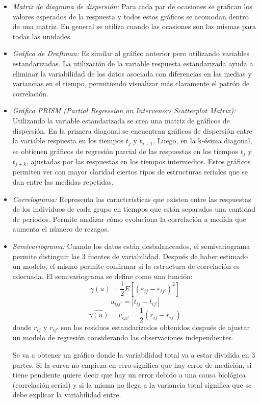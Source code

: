 \documentclass[12pt]{article}
\begin{document}
\begin{itemize}
	\item \emph{Matriz de diagrama de dispersión:} Para cada par de ocasiones se grafican los valores esperados de la
	respuesta y todos estos gráficos se acomodan dentro de una matriz. En general se utiliza cuando las ocasiones son las
	mismas para todas las unidades.
	\item \emph{Gráfico de Draftman:} Es similar al gráfico anterior pero utilizando variables estandarizadas.
	La utilización de la variable respuesta estandarizada ayuda a eliminar la variabilidad de los datos asociada con
	diferencias en las medias y variancias en el tiempo, permitiendo visualizar más claramente el patrón de correlación.
	\item \emph{Gráfico PRISM (Partial Regression on Intervenors Scatterplot Matrix):} Utilizando la variable estandarizada
	se crea una matriz de gráficos de dispersión. En la primera diagonal se encuentran gráficos de dispersión entre la
	variable respuesta en los tiempos $t_j$ y $t_{j+1}$. Luego, en la k-ésima diagonal, se obtienen gráficos de regresión
	parcial de las respuestas en los tiempos $t_j$ y $t_{j+k}$, ajustadas por las respuestas en los tiempos intermedios.
	Estos gráficos permiten ver con mayor claridad ciertos tipos de estructuras seriales que se dan entre las
	medidas repetidas.
	\item \emph{Correlograma:} Representa las características que existen entre las respuestas de los individuos de
	cada grupo en tiempos que están separados una cantidad de periodos. Permite analizar cómo evoluciona la correlación
	a medida que aumenta el número de rezagos.
	\item \emph{Semivariograma:} Cuando los datos están desbalanceados, el semivariograma permite distinguir las 3 fuentes
	de variabilidad. Después de haber estimado un modelo, el mismo permite confirmar si la estructura de correlación es
	adecuada. El semivariograma se define como una función:
	\[ \gamma(u) = \frac{1}{2} E[(\varepsilon _{ij} - \varepsilon_{ij'})^2] \]
	\[ u_{ijj'} = |t_{ij} - t_{ij'}| \]
	\[ \widehat{\gamma(u)} = v_{ijj'} = \frac{1}{2} (r_{ij} - r_{ij'}) \]
	donde $r_{ij}$ y $r_{ij'}$ son los residuos estandarizados obtenidos después de ajustar un modelo de regresión
	considerando las observaciones independientes.

	Se va a obtener un gráfico donde la variabilidad total va a estar dividida en 3 partes. Si la curva no empieza en
	cero significa que hay error de medición, si tiene pendiente quiere decir que hay un error debido a una causa
	biológica (correlación serial) y si la misma no llega a la variancia total significa que se debe explicar la
	variabilidad entre.
\end{itemize}
\end{document}
